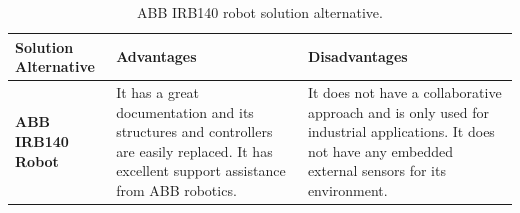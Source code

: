\documentclass[11pt]{report} %
\begin{document}
\begin{table}[H]
\begin{center}
    \begin{tabular}{M{6.6cm}M{3.3cm}M{3.3cm}}
    \hline
    \textbf{Solution Alternative} & \textbf{Advantages} & \textbf{Disadvantages} \\ 
    \hline
    
    \textbf{ABB IRB140 Robot}

    
    \citep{cite_abb_robots}

    &
    
    It has a great documentation and its structures and controllers are easily replaced. It has excellent support assistance from ABB robotics.
    
    &
    
    It does not have a collaborative approach and is only used for industrial applications. It does not have  any embedded external sensors for its environment.
    
    \\ \hline
    \end{tabular}
\caption{\label{tab:abb} ABB IRB140 robot solution alternative.}
\end{center}
\end{table}
\end{document}
